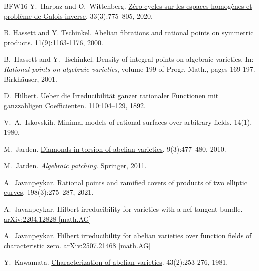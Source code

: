 \documentclass[10pt,a4paper]{amsart}
\theoremstyle{plain}
\theoremstyle{remark}
\numberwithin{theorem}{section}
\begin{document}
\begin{thebibliography}{BFW16}
Y.~Harpaz and O.~Wittenberg. 
\newblock \href{https://doi.org/10.1090/jams/943 }{Zéro-cycles sur les espaces homogènes et problème de Galois inverse}.
 33(3):775--805, 2020.

B. Hassett and Y. Tschinkel. 
\newblock \href{https://doi.org/10.1142/S0129167X00000544}{Abelian fibrations and rational points on symmetric products}.
 11(9):1163-1176, 2000. 

B.~Hassett and Y.~Tschinkel. 
\newblock Density of integral points on algebraic varieties.
\newblock In: {\em Rational points on algebraic varieties}, volume 199 of Progr. Math., pages 169-197. Birkhäuser, 2001.

D.~Hilbert.
\newblock \href{https://eudml.org/doc/148853}{Ueber die Irreducibilität ganzer rationaler Functionen mit ganzzahligen Coefficienten}.
 110:104--129, 1892.

V.~A.~Iskovskih. 
\newblock Minimal models of rational surfaces over arbitrary fields. 
 14(1), 1980.

M.~Jarden.
\newblock \href{https://doi.org/10.1017/S1474748009000255}{Diamonds in torsion of abelian varieties}.
 9(3):477--480, 2010.

M.~Jarden.
\newblock \href{https://doi.org/10.1007/978-3-642-15128-6}{\em Algebraic patching}.
\newblock Springer, 2011.

A.~Javanpeykar.
\newblock \href{https://doi.org/10.4064/aa200513-3-11}{Rational points and ramified covers of products of two elliptic curves}.
 198(3):275--287, 2021.

A.~Javanpeykar.
\newblock Hilbert irreducibility for varieties with a nef tangent bundle.
\newblock \href{https://doi.org/10.48550/arXiv.2204.12828}{arXiv:2204.12828 [math.AG]}

A.~Javanpeykar.
\newblock Hilbert irreducibility for abelian varieties over function fields of characteristic zero.
\newblock \href{https://doi.org/10.48550/arXiv.2507.21468}{arXiv:2507.21468 [math.AG]}

Y.~Kawamata.
\newblock \href{https://www.numdam.org/item/?id=CM_1981__43_2_253_0}{Characterization of abelian varieties}. 
 43(2):253-276, 1981.


\end{thebibliography}
\end{document}

